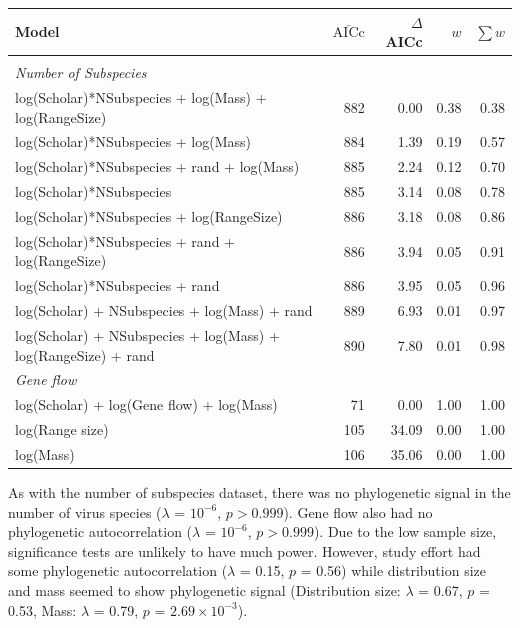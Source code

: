\begin{table}[t]
\begin{tabular}{@{}>{\footnotesize}p{8cm}rrrr@{}}
\toprule
\normalsize{Model} & $\bar{\text{AICc}}$ & $\Delta$AICc & $w$ & $\sum w$\\
\midrule
&&&&\\[-3mm]
\textit{\small{Number of Subspecies}} &&&&\\
log(Scholar)*NSubspecies  + log(Mass) + log(RangeSize) & 
882 & 0.00 &
0.38 & 0.38\\
log(Scholar)*NSubspecies  + log(Mass) & 
884 & 1.39 &
0.19 & 0.57\\
log(Scholar)*NSubspecies + rand + log(Mass) & 
885 & 2.24 &
0.12 & 0.70\\
log(Scholar)*NSubspecies  & 
885 & 3.14 &
0.08 & 0.78\\
log(Scholar)*NSubspecies  + log(RangeSize) & 
886 & 3.18 &
0.08 & 0.86\\
log(Scholar)*NSubspecies  + rand + log(RangeSize) & 
886 & 3.94 &
0.05 & 0.91\\
log(Scholar)*NSubspecies  + rand & 
886 & 3.95 &
0.05 & 0.96\\
log(Scholar) + NSubspecies + log(Mass) + rand & 
889 & 6.93 &
0.01 & 0.97\\
log(Scholar) + NSubspecies + log(Mass) + log(RangeSize) + rand& 
890 & 7.80 &
0.01 & 0.98\\[5mm]
\textit{\small{Gene flow}} &&&&\\
log(Scholar) + log(Gene flow) + log(Mass) & 
71 & 0.00 &
1.00 & 1.00\\
log(Range size) & 
105 & 34.09 &
0.00 & 1.00\\
log(Mass) & 
106 & 35.06 &
0.00 & 1.00\\
\bottomrule
\end{tabular}

\label{t:models}
\end{table}

As with the number of subspecies dataset, there was no phylogenetic signal in the number of virus species ($\lambda$ = \ensuremath{10^{-6}}, $p > 0.999$).
Gene flow also had no phylogenetic autocorrelation ($\lambda$ = \ensuremath{10^{-6}},  $p > 0.999$).
Due to the low sample size, significance tests are unlikely to have much power.
However, study effort had some phylogenetic autocorrelation ($\lambda$ = 0.15, $p$ = 0.56) while distribution size and mass seemed to show phylogenetic signal (Distribution size: $\lambda$ = 0.67, $p$ = 0.53, Mass: $\lambda$ = 0.79, $p$ = \ensuremath{2.69\times 10^{-3}}).


